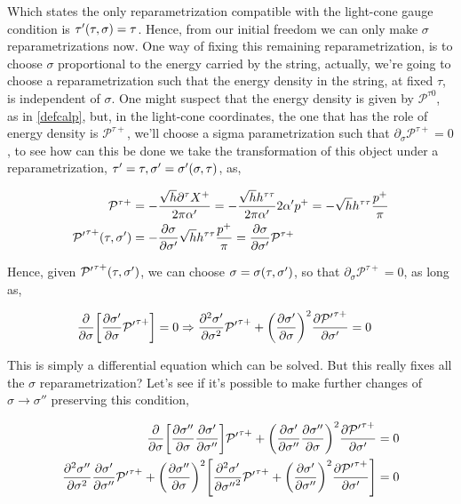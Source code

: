 Which states the only reparametrization compatible with the light-cone gauge condition is $\tau'\qty(\tau,\sigma)=\tau$. Hence, from our 
initial freedom we can only make $\sigma$ reparametrizations now. One way of fixing this remaining reparametrization, is to choose $\sigma$ proportional 
to the energy carried by the string, actually, we're going to choose a reparametrization such that the energy density in the string, at fixed $\tau$, is independent of 
$\sigma$. One might suspect that the energy density is given by $\mathcal P^{\tau0}$, as in \ref{defcalp}, but, in the light-cone coordinates, the one that has 
the role of energy density is $\mathcal P^{\tau+}$, we'll choose a sigma parametrization such that $\partial_\sigma\mathcal P^{\tau+}=0$, to see how can this 
be done we take the transformation of this object under a reparametrization, $\tau'=\tau,\sigma'=\sigma'\qty(\sigma,\tau)$, as,

\begin{align*}
    \mathcal P^{\tau+}&=-\frac{\sqrt h\partial^\tau X^+}{2\pi\alpha'}=-\frac{\sqrt h h^{\tau\tau}}{2\pi\alpha'}2\alpha'p^+=-\sqrt h h^{\tau\tau}\frac{p^+}{\pi}\\
    {\mathcal P'}^{\tau+}\qty(\tau,\sigma')&=-\pdv{\sigma}{\sigma'}\sqrt h h^{\tau\tau}\frac{p^+}{\pi}=\pdv{\sigma}{\sigma'}\mathcal P^{\tau+}
\end{align*}

Hence, given ${\mathcal P'}^{\tau+}\qty(\tau,\sigma')$, we can choose $\sigma=\sigma\qty(\tau,\sigma')$, so that $\partial_\sigma\mathcal P^{\tau+}=0$, as long as,

\begin{align*}
    \pdv{}{\sigma}\qty[{\pdv{\sigma'}{\sigma}}{\mathcal P'}^{\tau+}]&=0\Rightarrow{\pdv[2]{\sigma'}{\sigma}}{\mathcal P'}^{\tau+}+\qty(\pdv{\sigma'}{\sigma})^2\pdv{{\mathcal P'}^{\tau+}}{\sigma'}=0
\end{align*}

This is simply a differential equation which can be solved. But this really fixes all the $\sigma$ reparametrization? Let's see if it's possible to 
make further changes of $\sigma\rightarrow \sigma''$ preserving this condition,

\begin{align*}
    {\pdv{}{\sigma}}\qty[{\pdv{\sigma''}{\sigma}}{\pdv{\sigma'}{\sigma''}}]{\mathcal P'}^{\tau+}+\qty(\pdv{\sigma'}{\sigma''}\pdv{\sigma''}{\sigma})^2\pdv{{\mathcal P'}^{\tau+}}{\sigma'}&=0\\
    {\pdv[2]{\sigma''}{\sigma}}{\pdv{\sigma'}{\sigma''}}{\mathcal P'}^{\tau+}+\qty(\pdv{\sigma''}{\sigma})^2\qty[{\pdv[2]{{\sigma'}}{{\sigma''}}}{\mathcal P'}^{\tau+}
    +\qty(\pdv{\sigma'}{\sigma''})^2\pdv{{\mathcal P'}^{\tau+}}{\sigma'}
    ]&=0
\end{align*}

